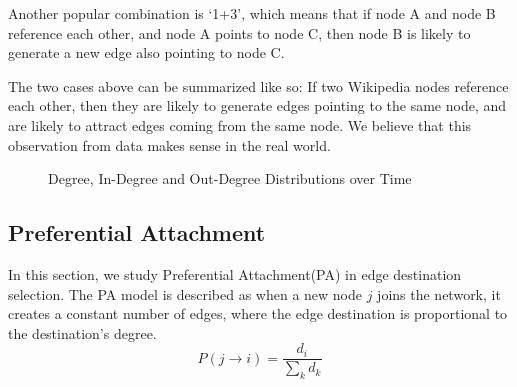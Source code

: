 \documentclass[10pt]{article}
\begin{document}
\begin{multicols}{2}
Another popular combination is `1+3', which means that if node A and node B reference each other, and node A points to node C, then node B is likely to generate a new edge also pointing to node C.

The two cases above can be summarized like so: If two Wikipedia nodes reference each other, then they are likely to generate edges pointing to the same node, and are likely to attract edges coming from the same node. We believe that this observation from data makes sense in the real world.

\begin{figure}
\caption{Degree, In-Degree and Out-Degree Distributions over Time \label{fig:degree}}
\end{figure}

\subsection{Preferential Attachment}
In this section, we study Preferential Attachment(PA) in edge destination selection. The PA model is described as when a new node $j$ joins the network, it creates a constant number of edges, where the edge destination is proportional to the destination's degree.
\begin{equation}
\label{1}
P(j\rightarrow i)=\frac{d_i}{\sum\limits_{k}d_k}
\end{equation}


\end{multicols}
\end{document}

